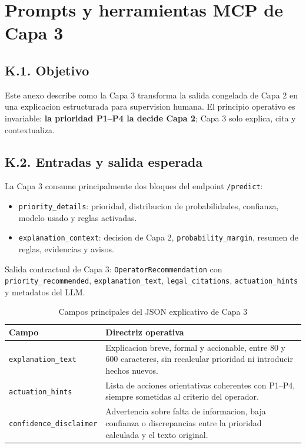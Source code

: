 \chapter{Prompts y herramientas MCP de Capa 3}
\label{cap:anexok}

\section*{K.1. Objetivo}

Este anexo describe como la Capa 3 transforma la salida congelada de Capa 2 en
una explicacion estructurada para supervision humana. El principio operativo es
invariable: \textbf{la prioridad P1--P4 la decide Capa 2}; Capa 3 solo explica,
cita y contextualiza.

\section*{K.2. Entradas y salida esperada}

La Capa 3 consume principalmente dos bloques del endpoint
\texttt{/predict}:

\begin{itemize}
    \item \texttt{priority\_details}: prioridad, distribucion de probabilidades,
    confianza, modelo usado y reglas activadas.
    \item \texttt{explanation\_context}: decision de Capa 2,
    \texttt{probability\_margin}, resumen de reglas, evidencias y avisos.
\end{itemize}

Salida contractual de Capa 3: \texttt{OperatorRecommendation} con
\texttt{priority\_recommended}, \texttt{explanation\_text},
\texttt{legal\_citations}, \texttt{actuation\_hints} y metadatos del LLM.

\begin{table}[ht]
\centering
\caption{Campos principales del JSON explicativo de Capa 3}
\label{tab:anexok-json}
\small
\begin{tabularx}{\textwidth}{|p{3.5cm}|X|}
\hline
\textbf{Campo} & \textbf{Directriz operativa} \\ \hline
\texttt{explanation\_text} & Explicacion breve, formal y accionable, entre 80 y 600 caracteres, sin recalcular prioridad ni introducir hechos nuevos. \\ \hline
\texttt{actuation\_hints} & Lista de acciones orientativas coherentes con P1--P4, siempre sometidas al criterio del operador. \\ \hline
\texttt{confidence\_disclaimer} & Advertencia sobre falta de informacion, baja confianza o discrepancias entre la prioridad calculada y el texto original. \\ \hline
\end{tabularx}
\end{table}

